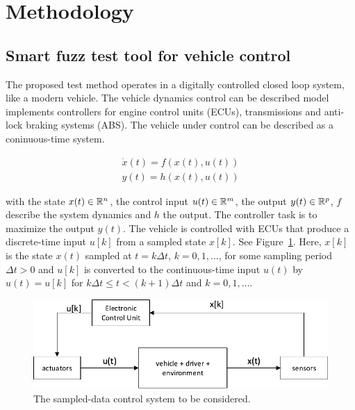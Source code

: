 \documentclass[a4paper, fleqn]{template/cas-dc}
\begin{document}
	\section{Methodology}
	\subsection{Smart fuzz test tool for vehicle control}
	
	The proposed test method operates in a digitally controlled closed loop system, like a modern vehicle. The vehicle dynamics control can be described model implements controllers for engine control units (ECUs), transmissions and anti-lock braking systems (ABS). The vehicle under control can be described as a coninuous-time system.
	
	\begin{equation}					
		\begin{aligned}
			\dot{x}(t) = f(x(t),u(t)) \\				
			y(t) = h(x(t),u(t))
		\end{aligned}	
	\end{equation}
	
	with the state $x(t)\in\mathbb R^n$, the control input $u(t)\in\mathbb R^m$, the output $y(t)\in\mathbb R^p$, $f$ describe the system dynamics and $h$ the output. The controller task is to maximize the output $y(t)$. The vehicle is controlled with ECUs that produce a discrete-time input $u[k]$ from a sampled state $x[k]$. See Figure~\ref{fig:system1}. Here, $x[k]$ is the state $x(t)$ sampled at $t = k\Delta t$, $k=0, 1, \ldots$, for some sampling period $\Delta t > 0$ and $u[k]$ is converted to the continuous-time input $u(t)$ by $u(t) = u[k]$ for $k \Delta t\leq t<(k+1)\Delta t$ and $k=0, 1, \ldots$.				
	
	\begin{figure}[h]
		\begin{center}
			\includegraphics[scale=0.5]{figures/system1_.pdf}
			\caption{The sampled-data control system to be considered.}
			\label{fig:system1}
		\end{center}
	\end{figure}
	
\end{document}
